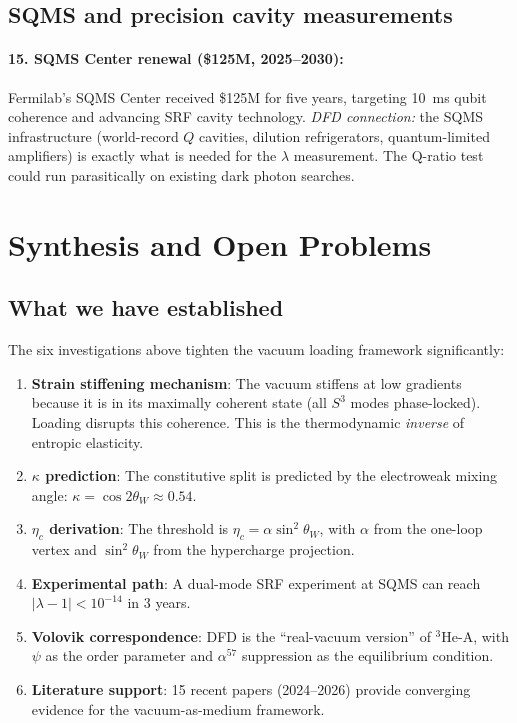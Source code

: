 \documentclass[aps,prd,twocolumn,superscriptaddress,nofootinbib]{revtex4-2}
\begin{document}
\subsection{SQMS and precision cavity measurements}

\paragraph{15. SQMS Center renewal (\$125M, 2025--2030):}
Fermilab's SQMS Center received \$125M for five years, targeting
10~ms qubit coherence and advancing SRF cavity technology.
\emph{DFD connection:} the SQMS infrastructure (world-record $Q$
cavities, dilution refrigerators, quantum-limited amplifiers) is
exactly what is needed for the $\lambda$ measurement.  The Q-ratio
test could run parasitically on existing dark photon searches.


\section{Synthesis and Open Problems}
\label{sec:synthesis}

\subsection{What we have established}

The six investigations above tighten the vacuum loading framework
significantly:

\begin{enumerate}
\item \textbf{Strain stiffening mechanism}: The vacuum stiffens at
  low gradients because it is in its maximally coherent state (all
  $S^3$ modes phase-locked).  Loading disrupts this coherence.
  This is the thermodynamic \emph{inverse} of entropic elasticity.
\item \textbf{$\kappa$ prediction}: The constitutive split is
  predicted by the electroweak mixing angle:
  $\kappa = \cos 2\theta_W \approx 0.54$.
\item \textbf{$\eta_c$ derivation}: The threshold is
  $\eta_c = \alpha \sin^2\theta_W$, with $\alpha$ from the one-loop
  vertex and $\sin^2\theta_W$ from the hypercharge projection.
\item \textbf{Experimental path}: A dual-mode SRF experiment at SQMS
  can reach $|\lambda - 1| < 10^{-14}$ in 3 years.
\item \textbf{Volovik correspondence}: DFD is the ``real-vacuum
  version'' of $^3$He-A, with $\psi$ as the order parameter and
  $\alpha^{57}$ suppression as the equilibrium condition.
\item \textbf{Literature support}: 15 recent papers (2024--2026)
  provide converging evidence for the vacuum-as-medium framework.
\end{enumerate}
\end{document}
